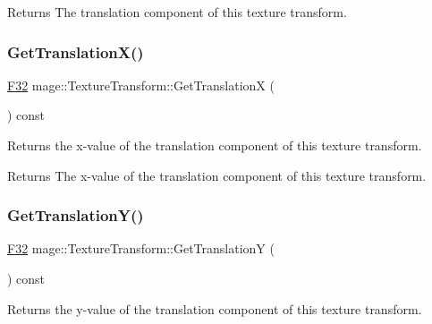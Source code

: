 \begin{DoxyReturn}{Returns}
The translation component of this texture transform. 
\end{DoxyReturn}
\mbox{\label{classmage_1_1_texture_transform_a94d51c47a75024fadfd849fc45e5268d}} 
\subsubsection{\texorpdfstring{Get\+Translation\+X()}{GetTranslationX()}}
{\footnotesize\ttfamily \mbox{\hyperlink{namespacemage_aa97e833b45f06d60a0a9c4fc22ae02c0}{F32}} mage\+::\+Texture\+Transform\+::\+Get\+TranslationX (\begin{DoxyParamCaption}{ }\end{DoxyParamCaption}) const\hspace{0.3cm}{\ttfamily [noexcept]}}

Returns the x-\/value of the translation component of this texture transform.

\begin{DoxyReturn}{Returns}
The x-\/value of the translation component of this texture transform. 
\end{DoxyReturn}
\mbox{\label{classmage_1_1_texture_transform_a55bb63ee1f43af0208074fd876ba8d74}} 
\subsubsection{\texorpdfstring{Get\+Translation\+Y()}{GetTranslationY()}}
{\footnotesize\ttfamily \mbox{\hyperlink{namespacemage_aa97e833b45f06d60a0a9c4fc22ae02c0}{F32}} mage\+::\+Texture\+Transform\+::\+Get\+TranslationY (\begin{DoxyParamCaption}{ }\end{DoxyParamCaption}) const\hspace{0.3cm}{\ttfamily [noexcept]}}

Returns the y-\/value of the translation component of this texture transform.

